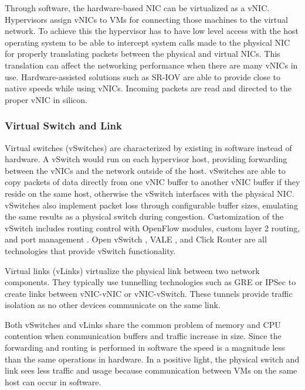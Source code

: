 \documentclass[12pt]{article}
\begin{document}
Through software, the hardware-based NIC can be virtualized as a vNIC. Hypervisors assign vNICs to VMs for connecting those machines to the virtual network. To achieve this the hypervisor has to have low level access with the host operating system to be able to intercept system calls made to the physical NIC for properly translating packets between the physical and virtual NICs. This translation can affect the networking performance when there are many vNICs in use. Hardware-assisted solutions such as SR-IOV \cite{dong2012renic} are able to provide close to native speeds while using vNICs. Incoming packets are read and directed to the proper vNIC in silicon.



\subsubsection{Virtual Switch and Link}

Virtual switches (vSwitches) are characterized by existing in software instead of hardware. A vSwitch would run on each hypervisor host, providing forwarding between the vNICs and the network outside of the host. vSwitches are able to copy packets of data directly from one vNIC buffer to another vNIC buffer if they reside on the same host, otherwise the vSwitch interfaces with the physical NIC. vSwitches also implement packet loss through configurable buffer sizes, emulating the same results as a physical switch during congestion. Customization of the vSwitch includes routing control with OpenFlow modules, custom layer 2 routing, and port management \cite{wang2015survey}. Open vSwitch \cite{crisan2013openvswitch}, VALE \cite{rizzo2012vale}, and Click Router \cite{wang2013clickrouter} are all technologies that provide vSwitch functionality.

Virtual links (vLinks) virtualize the physical link between two network components. They typically use tunnelling technologies such as GRE or IPSec to create links between vNIC-vNIC or vNIC-vSwitch. These tunnels provide traffic isolation as no other devices communicate on the same link.

Both vSwitches and vLinks share the common problem of memory and CPU contention when communication buffers and traffic increase in size. Since the forwarding and routing is performed in software the speed is a magnitude less than the same operations in hardware. In a positive light, the physical switch and link sees less traffic and usage because communication between VMs on the same host can occur in software.
\end{document}
